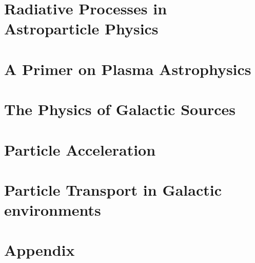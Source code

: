 \documentclass[letterpaper, 11pt, notitlepage]{report}
\begin{document}
\newpage

\tableofcontents\label{sec:contents}

\chapter{Radiative Processes in Astroparticle Physics}





\newpage

\chapter{A Primer on Plasma Astrophysics}




\newpage

\chapter{The Physics of Galactic Sources}



\newpage

\chapter{Particle Acceleration}






\newpage

\chapter{Particle Transport in Galactic environments}



\newpage

\appendix

\chapter{Appendix}






\newpage



\end{document}

